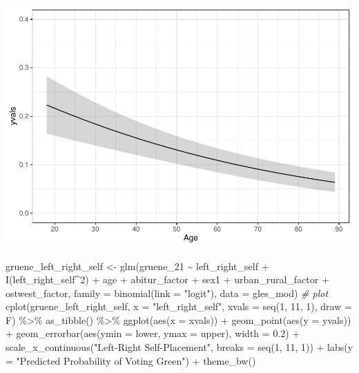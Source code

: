 \documentclass[
]{article}
\newenvironment{Shaded}{\begin{snugshade}}{\end{snugshade}}
\newcommand{\AttributeTok}[1]{\textcolor[rgb]{0.77,0.63,0.00}{#1}}
\newcommand{\CommentTok}[1]{\textcolor[rgb]{0.56,0.35,0.01}{\textit{#1}}}
\newcommand{\DecValTok}[1]{\textcolor[rgb]{0.00,0.00,0.81}{#1}}
\newcommand{\FloatTok}[1]{\textcolor[rgb]{0.00,0.00,0.81}{#1}}
\newcommand{\FunctionTok}[1]{\textcolor[rgb]{0.00,0.00,0.00}{#1}}
\newcommand{\NormalTok}[1]{#1}
\newcommand{\OtherTok}[1]{\textcolor[rgb]{0.56,0.35,0.01}{#1}}
\newcommand{\SpecialCharTok}[1]{\textcolor[rgb]{0.00,0.00,0.00}{#1}}
\newcommand{\StringTok}[1]{\textcolor[rgb]{0.31,0.60,0.02}{#1}}
\begin{document}
\includegraphics{AVCD_Final_Assignment-Edenhofer_files/figure-latex/gruene-age-1.pdf}

\begin{Shaded}
\begin{Highlighting}[]
\NormalTok{gruene\_left\_right\_self }\OtherTok{\textless{}{-}} \FunctionTok{glm}\NormalTok{(gruene\_21 }\SpecialCharTok{\textasciitilde{}}\NormalTok{ left\_right\_self }\SpecialCharTok{+} \FunctionTok{I}\NormalTok{(left\_right\_self}\SpecialCharTok{\^{}}\DecValTok{2}\NormalTok{) }\SpecialCharTok{+}\NormalTok{ age }\SpecialCharTok{+}\NormalTok{ abitur\_factor }\SpecialCharTok{+}\NormalTok{ sex1 }\SpecialCharTok{+}\NormalTok{ urban\_rural\_factor }\SpecialCharTok{+}\NormalTok{ ostwest\_factor, }\AttributeTok{family =} \FunctionTok{binomial}\NormalTok{(}\AttributeTok{link =} \StringTok{"logit"}\NormalTok{), }\AttributeTok{data =}\NormalTok{ gles\_mod)}
\CommentTok{\# plot }
\FunctionTok{cplot}\NormalTok{(gruene\_left\_right\_self, }\AttributeTok{x =} \StringTok{"left\_right\_self"}\NormalTok{, }
      \AttributeTok{xvals =} \FunctionTok{seq}\NormalTok{(}\DecValTok{1}\NormalTok{, }\DecValTok{11}\NormalTok{, }\DecValTok{1}\NormalTok{),}
      \AttributeTok{draw =}\NormalTok{ F) }\SpecialCharTok{\%\textgreater{}\%}
  \FunctionTok{as\_tibble}\NormalTok{() }\SpecialCharTok{\%\textgreater{}\%}
  \FunctionTok{ggplot}\NormalTok{(}\FunctionTok{aes}\NormalTok{(}\AttributeTok{x =}\NormalTok{ xvals)) }\SpecialCharTok{+}
  \FunctionTok{geom\_point}\NormalTok{(}\FunctionTok{aes}\NormalTok{(}\AttributeTok{y =}\NormalTok{ yvals)) }\SpecialCharTok{+}
  \FunctionTok{geom\_errorbar}\NormalTok{(}\FunctionTok{aes}\NormalTok{(}\AttributeTok{ymin =}\NormalTok{ lower, }\AttributeTok{ymax =}\NormalTok{ upper), }\AttributeTok{width =} \FloatTok{0.2}\NormalTok{) }\SpecialCharTok{+}
  \FunctionTok{scale\_x\_continuous}\NormalTok{(}\StringTok{"Left{-}Right Self{-}Placement"}\NormalTok{, }
                     \AttributeTok{breaks =} \FunctionTok{seq}\NormalTok{(}\DecValTok{1}\NormalTok{, }\DecValTok{11}\NormalTok{, }\DecValTok{1}\NormalTok{)) }\SpecialCharTok{+}
  \FunctionTok{labs}\NormalTok{(}\AttributeTok{y =} \StringTok{"Predicted Probability of Voting Green"}\NormalTok{) }\SpecialCharTok{+}
  \FunctionTok{theme\_bw}\NormalTok{()}
\end{Highlighting}
\end{Shaded}
\end{document}
